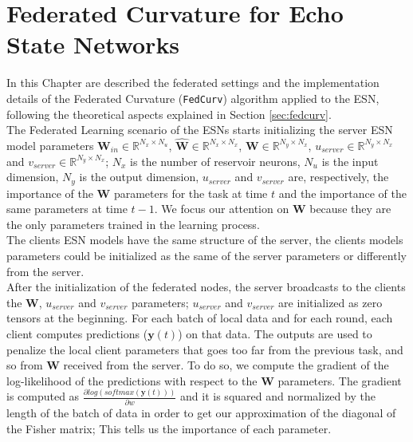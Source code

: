 \chapter{Federated Curvature for Echo State Networks}\label{chapter:fedcurv}

In this Chapter are described the federated settings and the implementation details of the Federated Curvature (\texttt{FedCurv}) algorithm applied to the ESN, following the theoretical aspects explained in Section \ref{sec:fedcurv}. \\

The Federated Learning scenario of the ESNs starts initializing the server ESN model parameters $\textbf{W}_{in}\in \mathbb{R}^{N_x\times N_u}$, $\widehat{\textbf{W}}\in \mathbb{R}^{N_x\times N_x}$, $\textbf{W}\in \mathbb{R}^{N_y\times N_x}$, $u_{server}\in \mathbb{R}^{N_y\times N_x}$ and $v_{server}\in \mathbb{R}^{N_y\times N_x}$; $N_x$ is the number of reservoir neurons, $N_u$ is the input dimension, $N_y$ is the output dimension, $u_{server}$ and $v_{server}$ are, respectively, the importance of the \textbf{W} parameters for the task at time $t$ and the importance of the same parameters at time $t-1$. We focus our attention on \textbf{W} because they are the only parameters trained in the learning process. \\

The clients ESN models have the same structure of the server, the clients models parameters could be initialized as the same of the server parameters or differently from the server. \\

After the initialization of the federated nodes, the server broadcasts to the clients the \textbf{W}, $u_{server}$ and $v_{server}$ parameters; $u_{server}$ and $v_{server}$ are initialized as zero tensors at the beginning. For each batch of local data and for each round, each client computes predictions ($\textbf{y}(t)$) on that data. The outputs are used to penalize the local client parameters that goes too far from the previous task, and so from \textbf{W} received from the server. To do so, we compute the gradient of the log-likelihood of the predictions with respect to the \textbf{W} parameters. The gradient is computed as $\frac{\partial log(softmax(\textbf{y}(t)))}{\partial w}$ and it is squared and normalized by the length of the batch of data in order to get our approximation of the diagonal of the Fisher matrix; This tells us the importance of each parameter. \\

